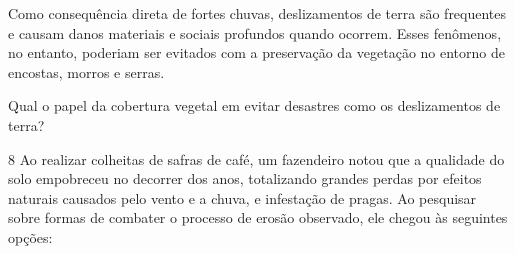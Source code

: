 Como consequência direta de fortes chuvas, deslizamentos de terra são
frequentes e causam danos materiais e sociais profundos quando ocorrem.
Esses fenômenos, no entanto, poderiam ser evitados com a preservação da
vegetação no entorno de encostas, morros e serras.

Qual o papel da cobertura vegetal em evitar desastres como os
deslizamentos de terra?



\num{8} Ao realizar colheitas de safras de café, um fazendeiro
notou que a qualidade do solo empobreceu no decorrer dos anos,
totalizando grandes perdas por efeitos naturais causados pelo vento e a
chuva, e infestação de pragas. Ao pesquisar sobre formas de combater o
processo de erosão observado, ele chegou às seguintes opções:

